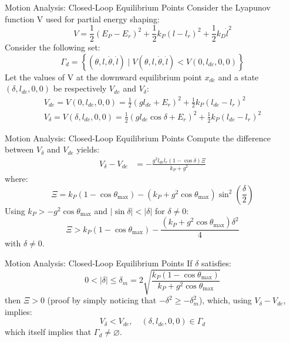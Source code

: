 \documentclass[10pt]{beamer}
\begin{document}
  \begin{frame}{Motion Analysis: Closed-Loop Equilibrium Points}
    Consider the Lyapunov function V used for partial energy shaping:
    \begin{equation*}
      V = \frac{1}{2}(E_P-E_r)^2+\frac{1}{2}k_P(l-l_r)^2+
        \frac{1}{2}k_D\dot{l}^2
    \end{equation*}
    Consider the following set:
    \begin{equation*}
      \Gamma_d = \left\{ (\theta, l, \dot{\theta}, \dot{l})
        \mid V(\theta, l, \dot{\theta}, \dot{l}) <
        V(0, l_{de}, 0, 0) \right\}
    \end{equation*}
    Let the values of V at the downward equilibrium point $x_{de}$
    and a state $(\delta, l_{de}, 0, 0)$ be respectively $V_{de}$
    and $V_\delta$:
    \begin{gather*}
      V_{de} = V(0, l_{de}, 0, 0) = \frac{1}{2}(g l_{de} + E_r)^2
        + \frac{1}{2} k_P (l_{de} - l_r)^2 \\
      V_\delta = V(\delta, l_{de}, 0, 0) = \frac{1}{2}(g l_{de}
        \cos\delta + E_r)^2 + \frac{1}{2} k_P (l_{de} - l_r)^2
    \end{gather*}
  \end{frame}

  \begin{frame}{Motion Analysis: Closed-Loop Equilibrium Points}
    Compute the difference between $V_\delta$ and $V_{de}$ yields:
    \begin{align*}
      V_\delta - V_{de} %
        &= -\frac{g^2 l_{de} l_r (1-\cos\delta) \Xi}{k_P+g^2}
    \end{align*}
    where:
    \begin{equation*}
        \Xi = k_P(1-\cos\theta_{\max})-(k_P+g^2\cos\theta_{\max})
            \sin^2 \left( \frac{\delta}{2} \right)
    \end{equation*}
    Using $k_P > -g^2\cos\theta_{\max}$ and
    $|\sin \delta|<|\delta|$ for $\delta \neq 0$:
    \begin{equation*}
      \Xi > k_P(1-\cos\theta_{\max})-
        \frac{(k_P+g^2\cos\theta_{\max})\delta^2}{4}
    \end{equation*}
    with $\delta \neq 0$.
  \end{frame}

  \begin{frame}{Motion Analysis: Closed-Loop Equilibrium Points}
    If $\delta$ satisfies:
    \begin{equation*}
      0 < |\delta| \le \delta_m = 2
        \sqrt{\frac{k_P(1-\cos\theta_{\max})}{k_P+g^2\cos\theta_{\max}}}
    \end{equation*}
    then $\Xi>0$ (proof by simply noticing that $-\delta^2\ge-\delta_m^2$),
    which, using $V_\delta - V_{de}$, implies:
    \begin{equation*}
      V_\delta < V_{de}, \quad (\delta, l_{de}, 0, 0) \in \Gamma_d
    \end{equation*}
    which itself implies%
    that $\Gamma_d \neq \varnothing$.
  \end{frame}
\end{document}
